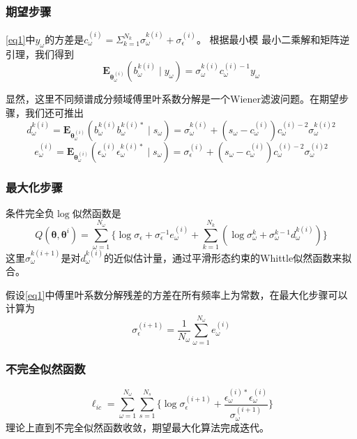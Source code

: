 \subsubsection{期望步骤}
\eqref{eq1}中$y_\omega$的方差是$c_\omega^{(i)}=\Sigma_{k=1}^{N_k}\sigma_\omega^{k(i)}+\sigma_\epsilon^{(i)}$。 根据最小模
最小二乘解和矩阵逆引理，我们得到
\begin{equation}\label{eq5}
\mathbf{E}_{\mathbf{\theta}_\omega^{(i)}}(b_\omega^{k(i)}\mid{y}_\omega)=\sigma_\omega^{k(i)}c_\omega^{(i)-1}y_\omega
\end{equation}

显然，这里不同频谱成分频域傅里叶系数分解是一个Wiener滤波问题。在期望步骤，我们还可推出
\begin{equation}\label{eq6}
d_\omega^{k(i)}=\mathbf{E}_{\mathbf{\theta}_\omega^{(i)}}(b_\omega^{k(i)}b_\omega^{k(i)*}\mid{s}_\omega)=\sigma_\omega^{k(i)}+(s_\omega-c_\omega^{(i)})c_\omega^{(i)-2}\sigma_\omega^{k(i)2}
\end{equation}
\begin{equation}\label{eq7}
e_\omega^{(i)}=\mathbf{E}_{\mathbf{\theta}_\omega^{(i)}}(\epsilon_\omega^{(i)}\epsilon_\omega^{k(i)*}\mid{s}_\omega)=\sigma_\epsilon^{(i)}+(s_\omega-c_\omega^{(i)})c_\omega^{(i)-2}\sigma_\omega^{(i)2}
\end{equation}

\subsubsection{最大化步骤}
条件完全负$\log$似然函数是
\begin{equation}\label{eq8}
Q(\mathbf{\theta},\mathbf{\theta}^{i})=\sum_{\omega=1}^{N_\omega}\lbrace\log{\sigma_\epsilon}+\sigma_\epsilon^{-1}e_\omega^{(i)}+\sum_{k=1}^{N_k}(\log{\sigma}_\omega^k+\sigma_\omega^{k-1}d_\omega^{k(i)})\rbrace
\end{equation}
这里$\sigma_\omega^{k(i+1)}$是对$d_\omega^{k(i)}$的近似估计量，通过平滑形态约束的Whittle似然函数来拟合。

假设\eqref{eq1}中傅里叶系数分解残差的方差在所有频率上为常数，在最大化步骤可以计算为
\begin{equation}\label{eq9}
\sigma_\epsilon^{(i+1)}=\frac{1}{N_\omega}\sum_{\omega=1}^{N_\omega}e_\omega^{(i)}
\end{equation}

\subsubsection{不完全似然函数}
\begin{equation}\label{eq10}
\ell_{ic}=\sum_{\omega=1}^{N_\omega}\sum_{s=1}^{N_s}\lbrace\log{\sigma_\epsilon^{(i+1)}}+\frac{\epsilon_\omega^{(i)*}\epsilon_\omega^{(i)}}{\sigma_\omega^{(i+1)}}\rbrace
\end{equation}
理论上直到不完全似然函数收敛，期望最大化算法完成迭代。

